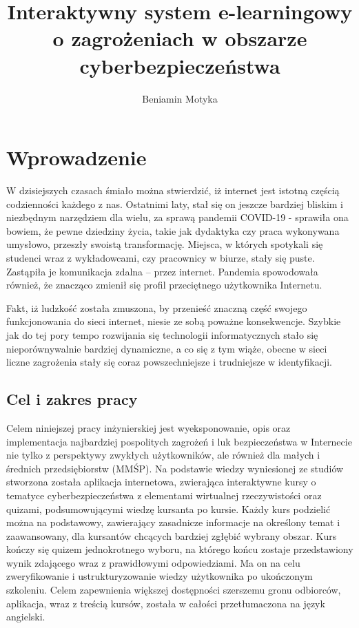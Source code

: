 \documentclass[12pt,twoside]{article}
\author{Beniamin Motyka}
\title{Interaktywny system e-learningowy o zagrożeniach w obszarze cyberbezpieczeństwa}
\begin{document}
\maketitle

\blankpage

\tableofcontents

\clearpage
\blankpage

\clearpage
\section{Wprowadzenie}

W dzisiejszych czasach śmiało można stwierdzić, iż	internet jest istotną częścią codzienności każdego z nas. Ostatnimi laty, stał się on jeszcze bardziej bliskim i niezbędnym narzędziem dla wielu, za sprawą pandemii COVID-19 - sprawiła ona bowiem, że pewne dziedziny życia, takie jak dydaktyka czy praca wykonywana umysłowo, przeszły swoistą transformację. Miejsca, w których spotykali się studenci wraz z wykładowcami, czy pracownicy w biurze, stały się puste. Zastąpiła je komunikacja zdalna -- przez internet. Pandemia spowodowała również, że znacząco zmienił się profil przeciętnego użytkownika Internetu.

Fakt, iż ludzkość została zmuszona, by przenieść znaczną część swojego funkcjonowania do sieci internet, niesie ze sobą poważne konsekwencje. Szybkie jak do tej pory tempo rozwijania się technologii informatycznych stało się nieporównywalnie bardziej dynamiczne, a co się z tym wiąże, obecne w sieci liczne zagrożenia stały się coraz powszechniejsze i trudniejsze w identyfikacji. 

\subsection{Cel i zakres pracy}

Celem niniejszej pracy inżynierskiej jest wyeksponowanie, opis oraz implementacja najbardziej pospolitych zagrożeń i luk bezpieczeństwa w Internecie nie tylko z perspektywy zwykłych użytkowników, ale również dla małych i średnich przedsiębiorstw (MMŚP). Na podstawie wiedzy wyniesionej ze studiów stworzona została aplikacja internetowa, zwierająca interaktywne kursy o tematyce cyberbezpieczeństwa z elementami wirtualnej rzeczywistości oraz quizami, podsumowującymi wiedzę kursanta po kursie. Każdy kurs podzielić można na podstawowy, zawierający zasadnicze informacje na określony temat i zaawansowany, dla kursantów chcących bardziej zgłębić wybrany obszar. Kurs kończy się quizem jednokrotnego wyboru, na którego końcu zostaje przedstawiony wynik zdającego wraz z prawidłowymi odpowiedziami. Ma on na celu zweryfikowanie i ustrukturyzowanie wiedzy użytkownika po ukończonym szkoleniu. Celem zapewnienia większej dostępności szerszemu gronu odbiorców, aplikacja, wraz z treścią kursów, została w całości przetłumaczona na język angielski.
\end{document}
